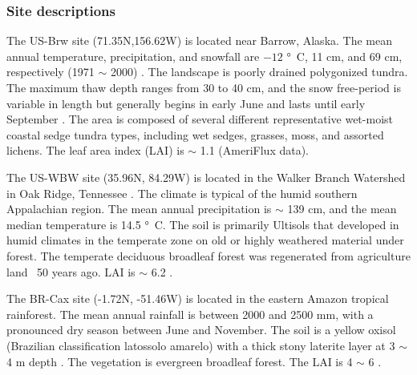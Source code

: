 \documentclass[gmd, manuscript]{copernicus}
\begin{document}
\subsubsection{Site descriptions}
The US-Brw site (71.35N,156.62W) is located near Barrow, Alaska. The mean annual
temperature, precipitation, and snowfall are $-12$ \unit{\degree C}, 11 cm, and
69 cm, respectively (1971 $\sim$ 2000) \citep{Lara2012}. The landscape is poorly
drained polygonized tundra. The maximum thaw depth ranges from 30 to 40 cm, and the
snow free-period is variable in length but generally begins in early June and
lasts until early September \citep{Hinkel2003}. The area is composed of several
different representative wet-moist coastal sedge tundra types, including wet
sedges, grasses, moss, and assorted lichens. The leaf area index (LAI) is
$\sim$ 1.1 (AmeriFlux data).

The US-WBW site (35.96N, 84.29W) is located in the Walker Branch Watershed in
Oak Ridge, Tennessee \citep{Hanson2003}. The climate is typical of the humid
southern Appalachian region. The mean annual precipitation is $\sim$ 139 cm, and
the mean median temperature is 14.5 \unit{\degree C}.  
The soil is primarily Ultisols that developed in humid climates in the
temperate zone on old or highly weathered material under forest. The temperate
deciduous broadleaf forest was regenerated from agriculture land ~50 years ago.
LAI is $\sim$ 6.2 \citep{Hanson2004}. %

The BR-Cax site (-1.72N, -51.46W) is located in the eastern Amazon tropical
rainforest. The mean annual rainfall is between 2000 and 2500 \unit{mm}, with a
pronounced dry season between June and November. The soil is a yellow oxisol
(Brazilian classification latossolo amarelo) with a thick stony laterite layer
at 3 $\sim$ 4 m depth \citep{daCosta2010}. The vegetation is evergreen
broadleaf forest. The LAI is 4 $\sim$ 6 \citep{Powell2013}. 
\end{document}
